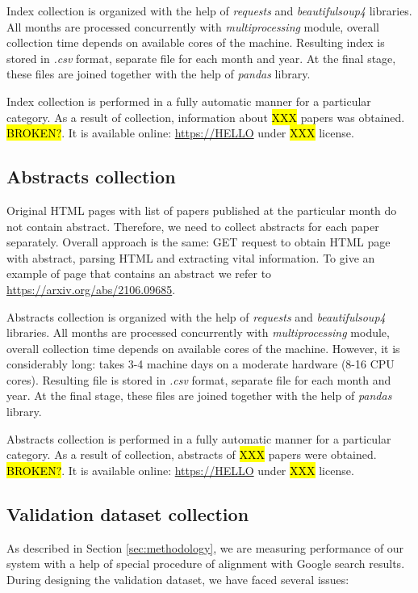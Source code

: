 \documentclass{article}
\begin{document}
        Index collection is organized with the help of \textit{requests} and \textit{beautifulsoup4} libraries. All months are processed concurrently with \textit{multiprocessing} module, overall collection time depends on available cores of the machine. Resulting index is stored in \textit{.csv} format, separate file for each month and year. At the final stage, these files are joined together with the help of \textit{pandas} library.

        Index collection is performed in a fully automatic manner for a particular category. As a result of collection, information about \hl{XXX} papers was obtained. \hl{BROKEN?}. It is available online: \url{https://HELLO} under \hl{XXX} license.

    \subsection{Abstracts collection}

        Original HTML pages with list of papers published at the particular month do not contain abstract. Therefore, we need to collect abstracts for each paper separately. Overall approach is the same: GET request to obtain HTML page with abstract, parsing HTML and extracting vital information. To give an example of page that contains an abstract we refer to \url{https://arxiv.org/abs/2106.09685}.

        Abstracts collection is organized with the help of \textit{requests} and \textit{beautifulsoup4} libraries. All months are processed concurrently with \textit{multiprocessing} module, overall collection time depends on available cores of the machine. However, it is considerably long: takes 3-4 machine days on a moderate hardware (8-16 CPU cores). Resulting file is stored in \textit{.csv} format, separate file for each month and year. At the final stage, these files are joined together with the help of \textit{pandas} library.

        Abstracts collection is performed in a fully automatic manner for a particular category. As a result of collection, abstracts of \hl{XXX} papers were obtained. \hl{BROKEN?}. It is available online: \url{https://HELLO} under \hl{XXX} license.

    
    \subsection{Validation dataset collection}

        As described in Section \ref{sec:methodology}, we are measuring performance of our system with a help of special procedure of alignment with Google search results. During designing the validation dataset, we have faced several issues:
        
\end{document}
